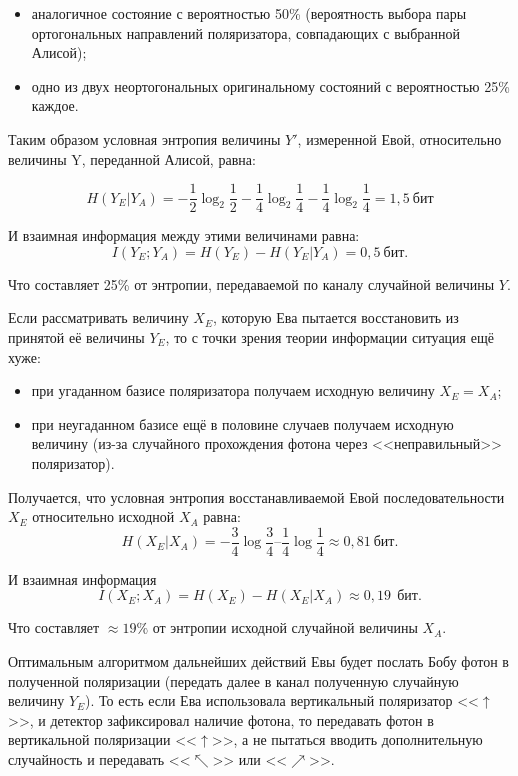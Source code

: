 \begin{itemize}
	\item аналогичное состояние с вероятностью 50\% (вероятность выбора пары ортогональных направлений поляризатора, совпадающих с выбранной Алисой);
	\item одно из двух неортогональных оригинальному состояний с вероятностью 25\% каждое.
\end{itemize}

Таким образом условная энтропия величины $Y'$, измеренной Евой, относительно величины Y, переданной Алисой, равна:

\[ H \left( Y_E | Y_A \right) = - \frac{1}{2} \log_2 \frac{1}{2} - \frac{1}{4} \log_2 \frac{1}{4} - \frac{1}{4} \log_2 \frac{1}{4} = 1,5~\text{бит} \]

И взаимная информация между этими величинами равна:
\[ I \left( Y_E ; Y_A \right) = H \left( Y_E \right) - H ( Y_E | Y_A ) = 0,5~\text{бит}.\]

Что составляет 25\% от энтропии, передаваемой по каналу случайной величины $Y$.

Если рассматривать величину $X_E$, которую Ева пытается восстановить из принятой её величины $Y_E$, то с точки зрения теории информации ситуация ещё хуже:

\begin{itemize}
	\item при угаданном базисе поляризатора получаем исходную величину $X_E = X_A$;
	\item при неугаданном базисе ещё в половине случаев получаем исходную величину (из-за случайного прохождения фотона через <<неправильный>> поляризатор).
\end{itemize}

Получается, что условная энтропия восстанавливаемой Евой последовательности $X_E$ относительно исходной $X_A$ равна:
\[ H \left( X_E | X_A \right) = - \frac{3}{4} \log \frac{3}{4} – \frac{1}{4} \log \frac{1}{4} \approx 0,81~\text{бит.}\]

И взаимная информация
\[ I \left( X_E; X_A \right) = H \left( X_E \right) - H \left( X_E | X_A \right) \approx 0,19~~\text{бит}. \]

Что составляет $\approx 19\%$ от энтропии исходной случайной величины $X_A$.

Оптимальным алгоритмом дальнейших действий Евы будет послать Бобу фотон в полученной поляризации (передать далее в канал полученную случайную величину $Y_E$). То есть если Ева использовала вертикальный поляризатор <<$\uparrow$>>, и детектор зафиксировал наличие фотона, то передавать фотон в вертикальной поляризации <<$\uparrow$>>, а не пытаться вводить дополнительную случайность и передавать <<$\nwarrow$>> или <<$\nearrow$>>.

